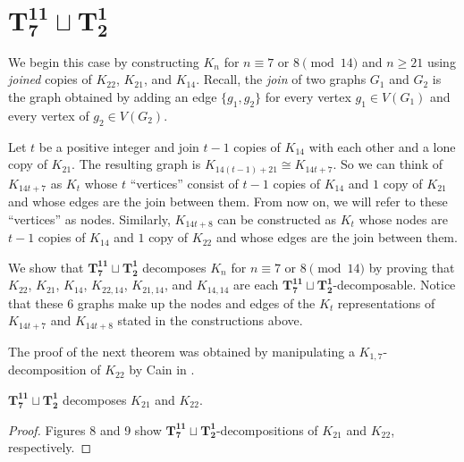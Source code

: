 \chapter{$\mathbf{T_{7}^{11}\sqcup T_{2}^{1}}$}
We begin this case by constructing $K_{n}$ for $n \equiv 7 \textrm{ or } 8 \pmod{14}$ and $n\geq 21$ using \textit{joined} copies of $K_{22}$, $K_{21}$, and $K_{14}$. Recall, the \textit{join} of two graphs $G_{1}$ and $G_{2}$ is the graph obtained by adding an edge $\{g_1,g_2\}$ for every vertex $g_1 \in V(G_{1})$ and every vertex of $g_2 \in V(G_{2})$.

Let $t$ be a positive integer and join $t-1$ copies of $K_{14}$ with each other and a lone copy of $K_{21}$. The resulting graph is $K_{14(t-1)+21} \cong K_{14t+7}$. So we can think of $K_{14t+7}$ as $K_{t}$ whose $t$ ``vertices'' consist of $t-1$ copies of $K_{14}$ and $1$ copy of $K_{21}$ and whose edges are the join between them. From now on, we will refer to these ``vertices'' as nodes. Similarly, $K_{14t+8}$ can be constructed as $K_{t}$ whose nodes are $t-1$ copies of $K_{14}$ and $1$ copy of $K_{22}$ and whose edges are the join between them.

We show that $\mathbf{T_{7}^{11}}\sqcup\mathbf{T_{2}^{1}}$ decomposes $K_{n}$ for $n\equiv7 \textrm{ or }8\pmod{14}$ by proving that $K_{22}$, $K_{21}$, $K_{14}$, $K_{22,14}$, $K_{21,14}$, and $K_{14,14}$ are each $\mathbf{T_{7}^{11}}\sqcup\mathbf{T_{2}^{1}}$-decomposable. Notice that these 6 graphs make up the nodes and edges of the $K_{t}$ representations of $K_{14t+7}$ and $K_{14t+8}$ stated in the constructions above.

\noindent The proof of the next theorem was obtained by manipulating a $K_{1,7}$-decomposition of $K_{22}$ by Cain in \cite{bib:Cain}.

\begin{thm}\label{thm:PCstarpath}
    $\mathbf{T_{7}^{11}}\sqcup\mathbf{T_{2}^{1}}$ decomposes $K_{21}$ and $K_{22}$.
\end{thm}

\begin{proof}
     Figures 8 and 9 show $\mathbf{T_{7}^{11}}\sqcup\mathbf{T_{2}^{1}}$-decompositions of $K_{21}$ and $K_{22}$, respectively.  %
\end{proof}

